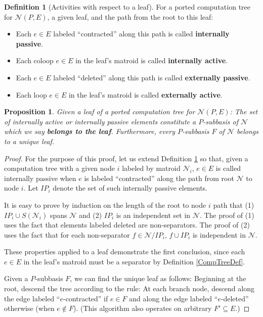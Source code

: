 \documentclass[12pt]{article}
\newtheorem{proposition}[theorem]{Proposition}
\theoremstyle{definition}
\newtheorem{definition}[theorem]{Definition}
\begin{document}
\begin{definition}[Activities with respect to a leaf]
\label{ActivityTreeDef}
For a ported computation tree for $\mathcal{N}(P,E)$, 
a given leaf, and the path from the root to this leaf:
\begin{itemize}
\item Each $e\in E$ labeled ``contracted'' along this path
is called \textbf{internally passive}.
\item Each coloop $e\in E$ in the leaf's matroid is
called \textbf{internally active}.
\item Each $e\in E$ labeled ``deleted'' along this path
is called \textbf{externally passive}.
\item Each loop $e\in E$ in the leaf's matroid is
called \textbf{externally active}.
\end{itemize}
\end{definition}

\begin{proposition}
Given a leaf of a ported computation tree for $\mathcal{N}(P,E)$:
The set of internally active or internally passive elements 
constitute a 
$P$-subbasis of $\mathcal{N}$ which we say 
\textbf{belongs to the leaf}.  
Furthermore, every $P$-subbasis $F$ of $\mathcal{N}$ belongs to a unique leaf.
\end{proposition}

\begin{proof}
For the purpose of this proof, let us extend Definition \ref{ActivityTreeDef}
so that, given a computation tree with a given node $i$ 
labeled by matroid $\mathcal{N}_i$,
$e\in E$ is called internally passive when $e$ is labeled 
``contracted'' along the path from root $\mathcal{N}$ to
node $i$.  Let $IP_i$ denote the set of such internally passive 
elements.

It is easy to prove by induction on the length of the root to node $i$ path
that
(1) $IP_i\cup S(\mathcal{N}_i)$ spans $\mathcal{N}$ and 
(2) $IP_i$ is an independent set in $\mathcal{N}$.  The proof
of (1) uses the fact that elements labeled deleted are non-separators.  The
proof of (2) uses the fact that for each non-separator 
$f\in\mathcal{N}/IP_i$, $f\cup IP_i$ is independent in $\mathcal{N}$.

These properties applied to a leaf demonstrate the first conclusion,
since each $e\in E$ in the leaf's matroid must be a separator by Definition 
\ref{CompTreeDef}.

Given a $P$-subbasis $F$, we can find the unique leaf as follows: Beginning
at the root, descend the tree according to the rule: At each branch node,
descend along the edge labeled ``$e$-contracted'' if $e\in F$ and along
the edge labeled ``$e$-deleted'' otherwise (when $e\not\in F$).
(This algorithm also operates on arbitrary $F'\subseteq E$.)
\end{proof}
\end{document}
